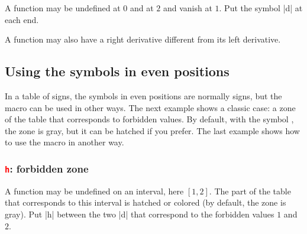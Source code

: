 A function may be undefined at $0$ and at $2$ and vanish at $1$. Put the symbol |d| at each end.

\begin{tkzexample}[width=7cm,small]
\end{tkzexample}

A function may also have a right derivative different from its left derivative.

\begin{tkzexample}[width=7cm,small]
\end{tkzexample}

\subsection{Using the symbols in even positions}

In a table of signs, the symbols in even positions are normally signs, but the macro can be used in other ways. The next example shows a classic case: a zone of the table that corresponds to forbidden values. By default, with the symbol , the zone is gray, but it can be hatched if you prefer.
The last example shows how to use the macro in another way.

\subsubsection{\texttt{\textcolor{red}{h}}: forbidden zone}

A function may be undefined on an interval, here $[1, 2]$. The part of the table that corresponds to this interval is hatched or colored (by default, the zone is gray). Put |h| between the two |d| that correspond to the forbidden values $1$ and $2$.

\begin{tkzexample}[width=8cm, small]
\end{tkzexample}

